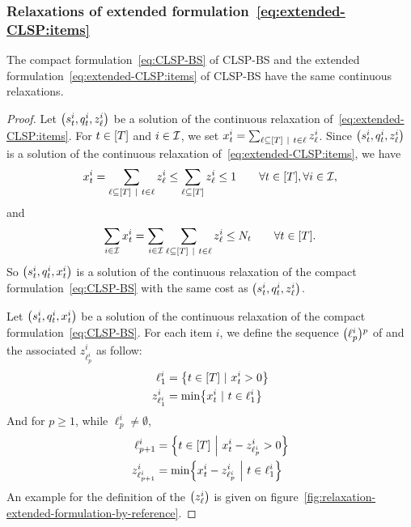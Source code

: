 \subsubsection{Relaxations of extended formulation~\eqref{eq:extended-CLSP:items}}



\begin{prop}\label{prop:extended-relaxation:items}
The compact formulation~\eqref{eq:CLSP-BS} of CLSP-BS and the extended formulation~\eqref{eq:extended-CLSP:items} of CLSP-BS have the same continuous relaxations.
\end{prop}



\begin{proof}
Let $\bracket{\inventory_t^i, \quantity_t^i, z_{\ell}^i}$ be a solution of the continuous relaxation of~\eqref{eq:extended-CLSP:items}.
For $t\in\range{\horizon}$ and $i\in\mathcal{I}$, we set $\setup_t^i=\sum_{\ell\subseteq\range{\horizon}~|~t\in\ell} z_{\ell}^i$.
Since $\bracket{\inventory_t^i, \quantity_t^i, z_{\ell}^i}$ is a solution of the continuous relaxation of~\eqref{eq:extended-CLSP:items}, we have
\begin{equation}
\setup_t^i
= \sum_{\ell\subseteq\range{\horizon}~|~t\in\ell} z_{\ell}^i
\le \sum_{\ell\subseteq\range{\horizon}} z_{\ell}^i
\le 1
\qquad \forall t\in\range{\horizon},\forall i\in\REF,
\end{equation}
and
\begin{equation}
\sum_{i\in\REF}\setup_t^i
= \sum_{i\in\REF}\sum_{\ell\subseteq\range{\horizon}~|~t\in\ell} z_{\ell}^i
\le \nbsetups_t
\qquad \forall t\in\range{\horizon}.
\end{equation}
So $\bracket{\inventory_t^i, \quantity_t^i, \setup_t^i}$  is a solution of the continuous relaxation of the compact formulation~\eqref{eq:CLSP-BS} with the same cost as $\bracket{\inventory_t^i, \quantity_t^i, z_{\ell}^i}$.


Let $\bracket{\inventory_t^i, \quantity_t^i, \setup_t^i}$ be a solution of the continuous relaxation of the compact formulation~\eqref{eq:CLSP-BS}. For each item $i$, we define the sequence $\bracket{\ell_p^i}^p$ of and the associated $z_{\ell_p^i}^i$ as follow:
\begin{equation}
  \begin{aligned}
  \ell_1^i       &= \crbracket{t\in\range{\horizon}~|~\setup_t^i>0} \\
  z_{\ell_1^i}^i &= \min\crbracket{\setup_t^i~|~t\in\ell_1^i}
  \end{aligned}
\end{equation}
And for $p\ge1$, while $\ell_p^i\ne\emptyset$,
\begin{equation}
  \begin{aligned}
  \ell_{p+1}^i       &= \crbracket{t\in\range{\horizon}~\Big|~\setup_t^i-z_{\ell_p^i}^i>0} \\
  z_{\ell_{p+1}^i}^i &= \min\crbracket{\setup_t^i-z_{\ell_p^i}^i~\Big|~t\in\ell_1^i}
  \end{aligned}
\end{equation}
An example for the definition of the $\bracket{z_{\ell}^i}$ is given on figure~\cref{fig:relaxation-extended-formulation-by-reference}.


\end{proof}
